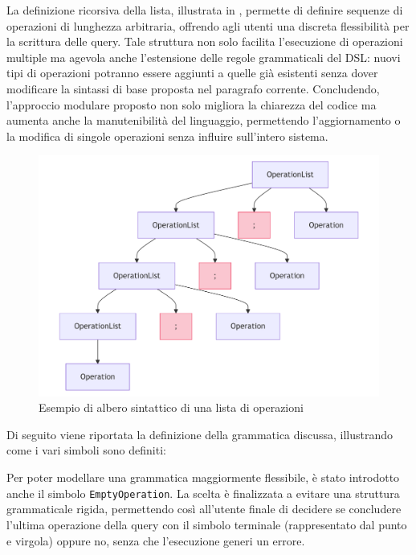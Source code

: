 \documentclass[12pt,a4paper,openright,twoside]{book}
\begin{document}
La definizione ricorsiva della lista, illustrata in , permette di definire sequenze di operazioni di lunghezza 
arbitraria, offrendo agli utenti una discreta flessibilità per la scrittura delle query. Tale struttura non solo facilita 
l’esecuzione di operazioni multiple ma agevola anche l'estensione delle regole grammaticali del DSL: nuovi tipi di operazioni 
potranno essere aggiunti a quelle già esistenti senza dover modificare la sintassi di base proposta nel paragrafo corrente. 
Concludendo, l'approccio modulare proposto non solo migliora la chiarezza del codice ma aumenta anche la manutenibilità del 
linguaggio, permettendo l’aggiornamento o la modifica di singole operazioni senza influire sull’intero sistema.

\begin{figure}[H]
    \centering
    \includegraphics[width=.8\linewidth]{figures/list-ast.pdf}
    \caption{Esempio di albero sintattico di una lista di operazioni}
    \label{fig:list-ast}
\end{figure}

Di seguito viene riportata la definizione della grammatica discussa, illustrando come i vari simboli sono definiti:

Per poter modellare una grammatica maggiormente flessibile, è stato introdotto anche il simbolo \texttt{EmptyOperation}. La scelta 
è finalizzata a evitare una struttura grammaticale rigida, permettendo così all’utente finale di decidere se concludere l’ultima 
operazione della query con il simbolo terminale (rappresentato dal punto e virgola) oppure no, senza che l’esecuzione generi un 
errore.
\end{document}
